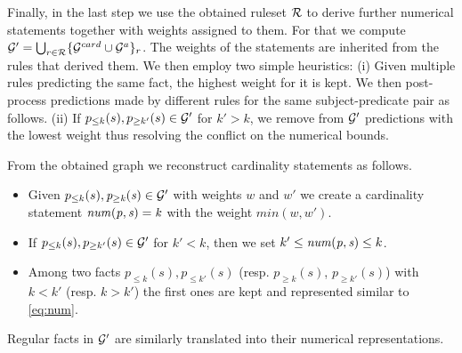  Finally, in the last step we use the obtained ruleset $\mathcal{R}$ to derive further numerical statements together with weights assigned to them. For that we compute $\mathcal{G}'=\bigcup_{r\in \mathcal{R}}\{\mathcal{G}^{card}\cup\mathcal{G}^{a}\}_{r}$. The weights of the statements are inherited from the rules that derived them. We then employ two simple heuristics: (i) Given multiple rules predicting the same fact, the highest weight for it is kept. We then post-process predictions made by different rules for the same subject-predicate pair as follows. 
(ii) If $p_{\leq k}(s),p_{\geq k'}(s)\in \mathcal{G}'$ for $k'>k$, we remove from $\mathcal{G}'$ predictions with the lowest weight thus resolving the conflict on the numerical bounds. %

From the obtained graph we reconstruct cardinality statements as follows.
\vspace{-\topsep}
\begin{itemize}
\item Given $p_{\leq k}(s),\mathit{p_{\geq k}(s)}\in \mathcal{G}'$ with weights $w$ and $w'$ %
we create a cardinality statement $\mathit{num(p,s)=k}$ with the weight $min(w,w')$. %
\item If $p_{\leq k}(s),p_{\geq k'}(s) \in \mathcal{G}'$ for $k'<k$, then we set $k' \leq \mathit{num(p,s)} \leq k$.
\item Among two facts $p_{\leq k}(s), p_{\leq k'}(s)$ (resp. $p_{\geq k}(s)$, $p_{\geq k'}(s)$) with $k<k'$ (resp. $k>k'$) the first ones are kept and represented similar to \ref{eq:num}. 
\end{itemize}

Regular facts in $\mathcal{G}'$ are similarly translated into their numerical representations.


